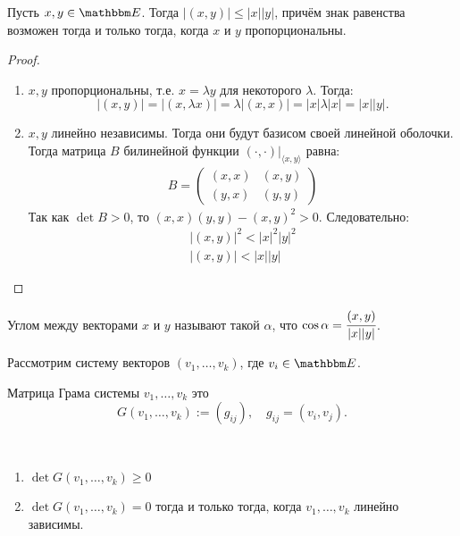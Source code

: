 \begin{Suggestion}
	Пусть $x, y \in \E$. Тогда $|(x,y)| \leqslant |x||y|$, причём знак равенства возможен тогда и только тогда, когда $x$ и $y$ пропорциональны.
\end{Suggestion}
\begin{proof}\
	\begin{enumerate}
		\item $x,y$ пропорциональны, т.е. $x = \lambda y$ для некоторого $\lambda$. Тогда:
		\[
			|(x,y)| = |(x,\lambda x)| = \lambda|(x,x)| = |x|\lambda|x| = |x||y|.
		\]
		\item $x,y$ линейно независимы. Тогда они будут базисом своей линейной оболочки. Тогда матрица $B$ билинейной функции $(\cdot, \cdot)\bigr|_{\langle x, y\rangle}$ равна:
		\begin{gather*}
		B = \begin{pmatrix}
			(x,x)& (x,y)\\
			(y,x)& (y,y)
		\end{pmatrix}
		\end{gather*}
	Так как $\det B > 0$, то $(x,x)(y,y) - (x,y)^2 > 0$. Следовательно:
	\begin{gather*}
			|(x,y)|^2 < |x|^2|y|^2\\
			|(x,y)| < |x||y|
	\end{gather*}
	\end{enumerate}
\end{proof}

\begin{Def}
	Углом между векторами $x$ и $y$ называют такой $\alpha$, что $ \cos \alpha = \cfrac{(x,y)}{|x||y|}$.
\end{Def}

Рассмотрим систему векторов $(v_1, \ldots, v_k)$, где $v_i \in \E$.
\begin{Def}
Матрица Грама системы $v_1, \ldots, v_k$ это
	$$G(v_1,\ldots, v_k) := (g_{ij}),\quad g_{ij} = (v_i,v_j).$$
\end{Def}

\begin{Suggestion}\
	\begin{enumerate}
		\item $\det G(v_1, \ldots, v_k) \geqslant 0$
		\item $\det G(v_1, \ldots, v_k) = 0$ тогда и только тогда, когда $v_1, \ldots, v_k$ линейно зависимы.
	\end{enumerate}
\end{Suggestion}

